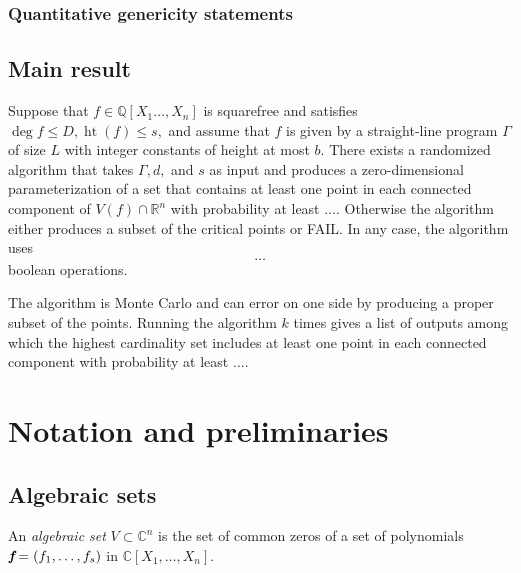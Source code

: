 \documentclass[sigconf]{acmart}
\DeclareMathOperator{\htt}{ht}
\def\C{\mathbb{C}}
\def\Q{\mathbb{Q}}
\def\R{\mathbb{R}}
\begin{document}
\subsubsection{Quantitative genericity statements}
%
%
%
%
\subsection{Main result}
\begin{theorem}
Suppose that $f\in\Q[X_1\hdots,X_n]$ is squarefree and satisfies $\deg f \leq D, \htt(f) \leq s,$ and assume that $f$ is given by a straight-line program $\Gamma$ of size $L$ with integer constants of height at most $b.$ There exists a randomized algorithm that takes $\Gamma, d,$ and $s$ as input and produces a zero-dimensional parameterization of a set that contains at least one point in each connected component of $V(f) \cap \R^n$ with probability at least $\hdots$. Otherwise the algorithm either produces a subset of the critical points or FAIL. In any case, the algorithm uses 
\[
\hdots  
\]
boolean operations.
\end{theorem}
%
The algorithm is Monte Carlo and can error on one side by producing a proper subset of the points. Running the algorithm $k$ times gives a list of outputs among which the highest cardinality set includes at least one point in each connected component with probability at least $\hdots.$
%
%
%
%
%
\section{Notation and preliminaries}
%
%
%
\subsection{Algebraic sets}
An \textit{algebraic set} $V \subset \C^n$ is the set of common zeros of a set of polynomials $\textit{\textbf{f}}=(f_1,\hdots,f_s)$ in $\C[X_1,\hdots,X_n].$
\end{document}
